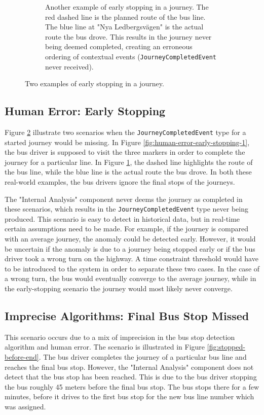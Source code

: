 \begin{figure}[h!]
\begin{subfigure}[t]{0.6\textwidth}
        \caption[Another example of early stopping in a journey]
        {\small Another example of early stopping in a journey.
        The red dashed line is the planned route of the bus line.
        The blue line at "Nya Ledbergsvägen" is the actual route the bus drove.
        This results in the journey never being deemed completed, creating an erroneous ordering of contextual events (\texttt{JourneyCompletedEvent} never received).}
        \label{fig:human-error-early-stopping-2}
    \end{subfigure}
    \caption[Two examples of early stopping in a journey]
    {\small Two examples of early stopping in a journey.}
    \label{fig:early-stopping}
\end{figure}

\subsection{Human Error: Early Stopping}
Figure \ref{fig:early-stopping} illustrate two scenarios when the \texttt{JourneyCompletedEvent} type for a started journey would be missing.
In Figure \ref{fig:human-error-early-stopping-1}, the bus driver is supposed to visit the three markers in order to complete the journey for a particular line.
In Figure \ref{fig:human-error-early-stopping-2}, the dashed line highlights the route of the bus line, while the blue line is the actual route the bus drove.
In both these real-world examples, the bus drivers ignore the final stops of the journeys.

The "Internal Analysis" component never deems the journey as completed in these scenarios, which results in the \texttt{JourneyCompletedEvent} type never being produced.
This scenario is easy to detect in historical data, but in real-time certain assumptions need to be made.
For example, if the journey is compared with an average journey, the anomaly could be detected early.
However, it would be uncertain if the anomaly is due to a journey being stopped early or if the bus driver took a wrong turn on the highway.
A time constraint threshold would have to be introduced to the system in order to separate these two cases.
In the case of a wrong turn, the bus would eventually converge to the average journey, while in the early-stopping scenario the journey would most likely never converge.

\subsection{Imprecise Algorithms: Final Bus Stop Missed}
This scenario occurs due to a mix of imprecision in the bus stop detection algorithm and human error.
The scenario is illustrated in Figure \ref{fig:stopped-before-end}.
The bus driver completes the journey of a particular bus line and reaches the final bus stop.
However, the "Internal Analysis" component does not detect that the bus stop has been reached.
This is due to the bus driver stopping the bus roughly 45 meters before the final bus stop.
The bus stops there for a few minutes, before it drives to the first bus stop for the new bus line number which was assigned.

